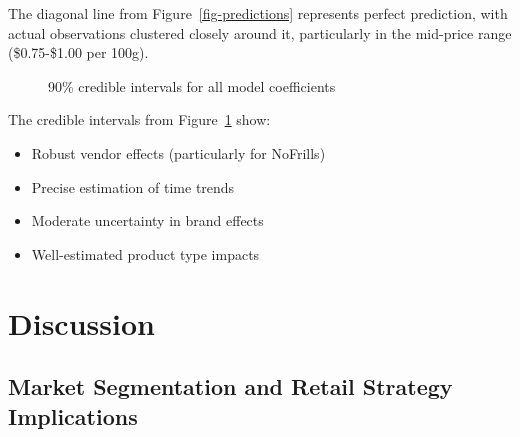 \documentclass[
  letterpaper,
  DIV=11,
  numbers=noendperiod]{scrartcl}
\begin{document}
The diagonal line from Figure~\ref{fig-predictions} represents perfect
prediction, with actual observations clustered closely around it,
particularly in the mid-price range (\$0.75-\$1.00 per 100g).

\begin{figure}[H]


\caption{\label{fig-intervals}90\% credible intervals for all model
coefficients}

\end{figure}%

The credible intervals from Figure~\ref{fig-intervals} show:

\begin{itemize}
\item
  Robust vendor effects (particularly for NoFrills)
\item
  Precise estimation of time trends
\item
  Moderate uncertainty in brand effects
\item
  Well-estimated product type impacts
\end{itemize}

\section{Discussion}\label{discussion}

\subsection{Market Segmentation and Retail Strategy
Implications}\label{market-segmentation-and-retail-strategy-implications}
\end{document}
